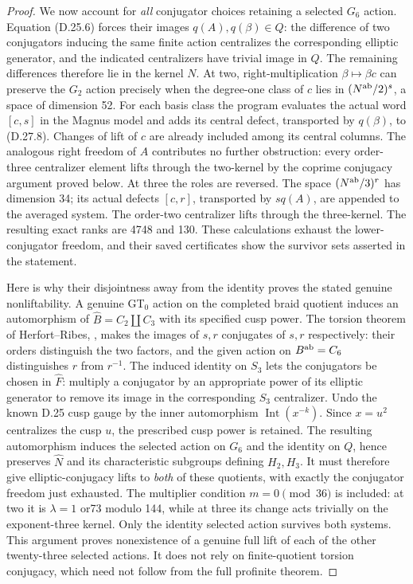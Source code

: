 \begin{proof}
We now account for \emph{all} conjugator choices retaining
a selected $G_6$ action. Equation (D.25.6) forces their
images $q(A),q(\beta)\in Q$: the difference of two
conjugators inducing the same finite action centralizes
the corresponding elliptic generator, and the indicated
centralizers have trivial image in $Q$. The remaining
differences therefore lie in the kernel $N$.
At two, right-multiplication $\beta\mapsto\beta c$ can
preserve the $G_2$ action precisely when the degree-one
class of $c$ lies in $(N^{\rm ab}/2)^s$, a space of
dimension 52. For each basis class the program evaluates
the actual word $[c,s]$ in the Magnus model and adds its
central defect, transported by $q(\beta)$, to (D.27.8).
Changes of lift of $c$ are already included among its
central columns. The analogous right freedom of $A$
contributes no further obstruction: every order-three
centralizer element lifts through the two-kernel by
the coprime conjugacy argument proved below. At three
the roles are reversed. The space $(N^{\rm ab}/3)^r$
has dimension 34; its actual defects $[c,r]$, transported
by $s q(A)$, are appended to the averaged system.
The order-two centralizer lifts through the three-kernel.
The resulting exact ranks are 4748 and 130. These
calculations exhaust the lower-conjugator freedom,
and their saved certificates show the survivor sets
asserted in the statement.

Here is why their disjointness away from the identity
proves the stated genuine nonliftability. A genuine GT$_0$
action on the completed braid quotient induces an
automorphism of
$\widehat B=C_2\amalg C_3$ with its specified cusp power.
The torsion theorem of Herfort--Ribes,
\cite[Theorem A, p.~155; Theorem A$'$, pp.~157--159]{A_HerfortRibes1985},
makes the images of $s,r$ conjugates of $s,r$ respectively:
their orders distinguish the two factors, and the given
action on $B^{\rm ab}=C_6$ distinguishes $r$ from $r^{-1}$.
The induced identity on $S_3$ lets the conjugators be
chosen in $\widehat F$: multiply a conjugator by an
appropriate power of its elliptic generator to remove
its image in the corresponding $S_3$ centralizer.
Undo the known D.25 cusp gauge by the inner automorphism
$\operatorname{Int}(x^{-k})$. Since $x=u^2$ centralizes
the cusp $u$, the prescribed cusp power is retained.
The resulting automorphism induces the selected action
on $G_6$ and the identity on $Q$, hence preserves
$\widehat N$ and its characteristic subgroups defining
$H_2,H_3$. It must therefore give elliptic-conjugacy
lifts to \emph{both} of these quotients, with exactly
the conjugator freedom just exhausted. The multiplier
condition $m=0\pmod{36}$ is included: at two it is
$\lambda=1$ or73 modulo 144, while at three its change
acts trivially on the exponent-three kernel. Only the
identity selected action survives both systems.
This argument proves nonexistence of a genuine full
lift of each of the other twenty-three selected actions.
It does not rely on finite-quotient torsion conjugacy,
which need not follow from the full profinite theorem.


\end{proof}
